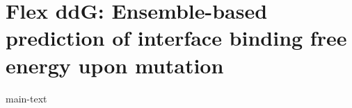 \chapter{Flex ddG: Ensemble-based prediction of interface binding free energy upon mutation}
\label{chapter:flex-ddG}


{main-text}

